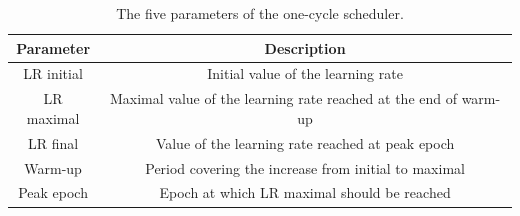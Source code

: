 \begin{table}[h]
  \begin{center}
      \begin{tabular}{c|c} 
      	 \hline \hline
          Parameter   & Description \\ \hline
          LR initial  & Initial value of the learning rate   \\ 
          LR maximal  & Maximal value of the learning rate reached at the end of warm-up   \\ 
          LR final    & Value of the learning rate reached at peak epoch    \\ 
          Warm-up     & Period covering the increase from initial to maximal   \\ 
          Peak epoch  & Epoch at which LR maximal should be reached   \\ \hline \hline
      \end{tabular}
    \caption{The five parameters of the one-cycle scheduler.}
    \label{tab:onecyclescheduler}
  \end{center}
\end{table}

